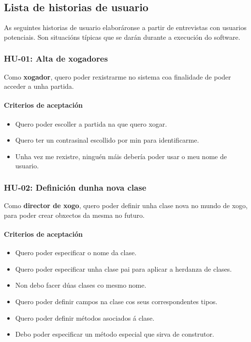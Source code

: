 \subsection{Lista de historias de usuario}
As seguintes historias de usuario elaboráronse a partir de entrevistas con
usuarios potenciais. Son situacións típicas que se darán durante a
execución do software.

\subsubsection{HU-01: Alta de xogadores}
Como \textbf{xogador}, quero poder rexistrarme no sistema coa finalidade de
poder acceder a unha partida.
\paragraph{Criterios de aceptación}
\begin{itemize}
  \item Quero poder escoller a partida na que quero xogar.
  \item Quero ter un contrasinal escollido por min para identificarme.
  \item Unha vez me rexistre, ninguén máis debería poder usar o meu nome de
  usuario.
\end{itemize}

\subsubsection{HU-02: Definición dunha nova clase}
Como \textbf{director de xogo}, quero poder definir unha clase nova no mundo de
xogo, para poder crear obxectos da mesma no futuro.
\paragraph{Criterios de aceptación}
\begin{itemize}
  \item Quero poder especificar o nome da clase.
  \item Quero poder especificar unha clase pai para aplicar a herdanza de
  clases.
  \item Non debo facer dúas clases co mesmo nome.
  \item Quero poder definir campos na clase cos seus correspondentes tipos.
  \item Quero poder definir métodos asociados á clase.
  \item Debo poder especificar un método especial que sirva de construtor.
\end{itemize}

